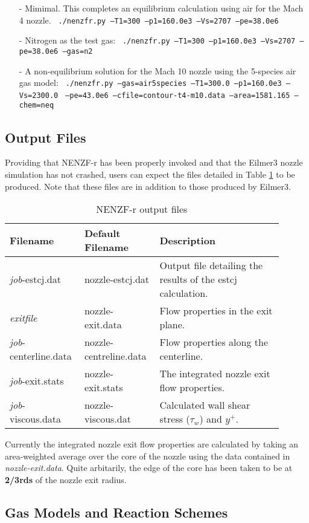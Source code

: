 \begin{itemize}
\item[-] Mimimal. This completes an equilibrium calculation using air for the Mach 4 nozzle. 
\newline
\texttt{   ./nenzfr.py --T1=300 --p1=160.0e3 --Vs=2707 --pe=38.0e6}
\item[-] Nitrogen as the test gas:
\newline
\texttt{   ./nenzfr.py --T1=300 --p1=160.0e3 --Vs=2707 --pe=38.0e6 --gas=n2}
\item[-] A non-equilibrium solution for the Mach 10 nozzle using the 5-species air gas model:
\newline
\texttt{   ./nenzfr.py --gas=air5species --T1=300.0 --p1=160.0e3 --Vs=2300.0}
\newline
\texttt{       --pe=43.0e6 --cfile=contour-t4-m10.data --area=1581.165 --chem=neq}
\end{itemize}

\subsection{Output Files}
Providing that NENZF-r has been properly invoked and that the Eilmer3 nozzle simulation has not crashed, users can expect the files detailed in Table \ref{tab:output-files} to be produced. Note that these files are in addition to those produced by Eilmer3.

\begin{table}[!ht]
\centering
\caption{NENZF-r output files}
\begin{tabular}{p{0.22\linewidth}|p{0.25\linewidth}|p{0.43\linewidth}} 
\hline
Filename & Default Filename & Description \\ 
\hline
\textit{job}-estcj.dat & nozzle-estcj.dat & Output file detailing the results of the estcj calculation.\\
\textit{exitfile} & nozzle-exit.data & Flow properties in the exit plane.\\
\textit{job}-centerline.data & nozzle-centreline.data & Flow properties along the centerline.\\
\textit{job}-exit.stats & nozzle-exit.stats & The integrated nozzle exit flow properties.\\
\textit{job}-viscous.data & nozzle-viscous.dat & Calculated wall shear stress ($\tau_w$) and $y^+$.\\
\hline 
\end{tabular}
\label{tab:output-files}
\end{table}

Currently the integrated nozzle exit flow properties are calculated by taking an area-weighted average over the core of the nozzle using the data contained in \textit{nozzle-exit.data}. Quite arbitarily, the edge of the core has been taken to be at \textbf{2/3rds} of the nozzle exit radius.

\subsection{Gas Models and Reaction Schemes}



